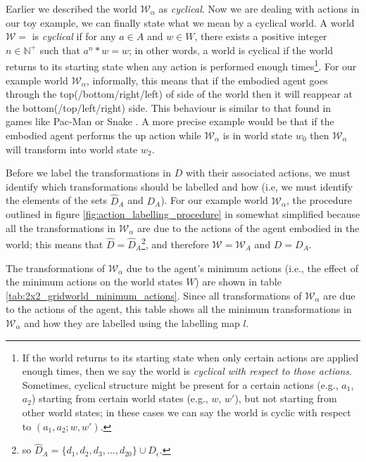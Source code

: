 Earlier we described the world $\mathscr{W}_{\alpha}$ as \emph{cyclical}.
Now we are dealing with actions in our toy example, we can finally state what we mean by a cyclical world.
A world $\mathscr{W} = $ is \emph{cyclical} if for any $a \in A$ and $w \in W$, there exists a positive integer $n \in \mathbb{N}^{+}$ such that $a^{n} \ast w = w$; in other words, a world is cyclical if the world returns to its starting state when any action is performed enough times\footnote{
	If the world returns to its starting state when only certain actions are applied enough times, then we say the world is \emph{cyclical with respect to those actions}.
	Sometimes, cyclical structure might be present for a certain actions (e.g., $a_{1}$, $a_{2}$) starting from certain world states (e.g., $w$, $w'$), but not starting from other world states; in these cases we can say the world is cyclic with respect to $(a_{1}, a_{2}; w, w')$.
}.
For our example world $\mathscr{W}_{\alpha}$, informally, this means that if the embodied agent goes through the top(/bottom/right/left) of side of the world then it will reappear at the bottom(/top/left/right) side.
This behaviour is similar to that found in games like Pac-Man  or Snake .
A more precise example would be that if the embodied agent performs the up action while $\mathscr{W}_{\alpha}$ is in world state $w_{0}$ then $\mathscr{W}_{\alpha}$ will transform into world state $w_{2}$.

Before we label the transformations in $D$ with their associated actions, we must identify which transformations should be labelled and how (i.e, we must identify the elements of the sets $\hat{D}_{A}$ and $D_{A}$).
For our example world $\mathscr{W}_{\alpha}$, the procedure outlined in figure \ref{fig:action_labelling_procedure} in somewhat simplified because all the transformations in $\mathscr{W}_{\alpha}$ are due to the actions of the agent embodied in the world; this means that $\hat{D} = \hat{D}_{A}$\footnote{so $\hat{D}_{A} = \{ d_{1}, d_{2}, d_{3}, \dots, d_{20} \} \cup D_{\epsilon}$.}, and therefore $\mathscr{W} = \mathscr{W}_{A}$ and $D = D_{A}$.

The transformations of $\mathscr{W}_{\alpha}$ due to the agent's minimum actions (i.e., the effect of the minimum actions on the world states $W$) are shown in table \ref{tab:2x2_gridworld_minimum_actions}.
Since all transformations of $\mathscr{W}_{\alpha}$ are due to the actions of the agent, this table shows all the minimum transformations in $\mathscr{W}_{\alpha}$ and how they are labelled using the labelling map $l$.

